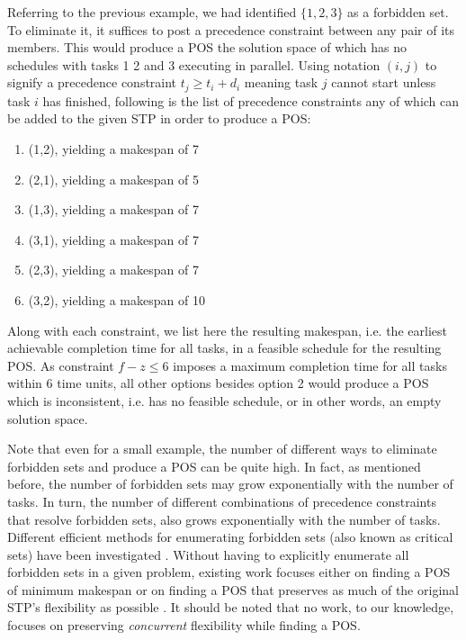 	\begin{example}
		Referring to the previous example, we had identified $\{1,2,3\}$ as a forbidden set.
		To eliminate it, it suffices to post a precedence constraint between any pair of its members.
		This would produce a POS the solution space of which has no schedules with tasks 1 2 and 3 executing in parallel.
		Using notation $(i,j)$ to signify a precedence constraint $t_j \geq t_i + d_i$ meaning task $j$ cannot start unless task $i$ has finished,
		following is the list of precedence constraints any of which can be added to the given STP in order to produce a POS:
		\begin{enumerate}
			\item (1,2), yielding a makespan of 7
			\item (2,1), yielding a makespan of 5
			\item (1,3), yielding a makespan of 7
			\item (3,1), yielding a makespan of 7
			\item (2,3), yielding a makespan of 7
			\item (3,2), yielding a makespan of 10
		\end{enumerate}
		Along with each constraint, we list here the resulting makespan, 
		i.e. the earliest achievable completion time for all tasks, in a feasible schedule for the resulting POS.
		As constraint $f - z \leq 6$ imposes a maximum completion time for all tasks within 6 time units,
		all other options besides option 2 would produce a POS which is inconsistent, 
		i.e. has no feasible schedule, or in other words, an empty solution space.
	\end{example}

	Note that even for a small example, 
	the number of different ways to eliminate forbidden sets and produce a POS can be quite high.
	In fact, as mentioned before, the number of forbidden sets may grow exponentially with the number of tasks.
	In turn, the number of different combinations of precedence constraints that resolve forbidden sets, also grows exponentially with the number of tasks.
	Different efficient methods for enumerating forbidden sets (also known as critical sets) have been investigated \cite{stork2005generation,lombardi2012min}.
	Without having to explicitly enumerate all forbidden sets in a given problem,
	existing work focuses either on finding a POS of minimum makespan \cite{oddi2009iterative} or on finding a POS 
	that preserves as much of the original STP's flexibility as possible \cite{policella2009solve,policella:2007}.
	It should be noted that no work, to our knowledge, focuses on preserving \emph{concurrent} flexibility while finding a POS.

